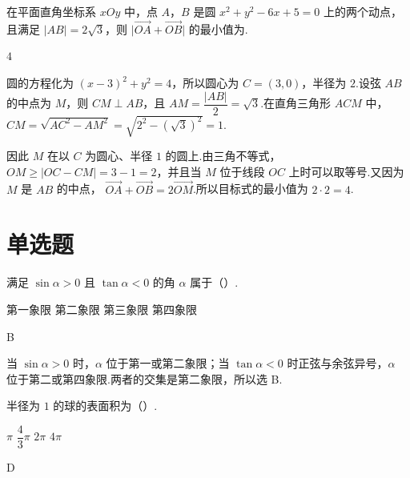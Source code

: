 \begin{problem}
在平面直角坐标系 \(xOy\) 中，点 \(A\)，\(B\) 是圆 \(x^2+y^2-6x+5=0\) 上的两个动点，且满足 \(\lvert AB\rvert=2\sqrt3\)，则 \(\lvert\overrightarrow{OA}+\overrightarrow{OB}\rvert\) 的最小值为\fillinblank{}.
\end{problem}

\begin{answer}
\(4\)
\end{answer}

\begin{solution}
圆的方程化为 \((x-3)^2+y^2=4\)，所以圆心为 \(C=(3,0)\)，半径为 \(2\).设弦 \(AB\) 的中点为 \(M\)，则 \(CM\perp AB\)，且
\(AM=\dfrac{|AB|}{2}=\sqrt3\).在直角三角形 \(ACM\) 中，
\(CM=\sqrt{AC^2-AM^2}=\sqrt{2^2-(\sqrt3)^2}=1\).

因此 \(M\) 在以 \(C\) 为圆心、半径 \(1\) 的圆上.由三角不等式，
\(OM\geq|OC-CM|=3-1=2\)，并且当 \(M\) 位于线段 \(OC\) 上时可以取等号.又因为 \(M\) 是 \(AB\) 的中点，
\(\overrightarrow{OA}+\overrightarrow{OB}=2\overrightarrow{OM}\).所以目标式的最小值为 \(2\cdot2=4\).
\end{solution}

\section{单选题}

\begin{problem}
满足 \(\sin\alpha>0\) 且 \(\tan\alpha<0\) 的角 \(\alpha\) 属于（\quad）.

\choices
    {第一象限}
    {第二象限}
    {第三象限}
    {第四象限}
\end{problem}

\begin{answer}
B
\end{answer}

\begin{solution}
当 \(\sin\alpha>0\) 时，\(\alpha\) 位于第一或第二象限；当 \(\tan\alpha<0\) 时正弦与余弦异号，\(\alpha\) 位于第二或第四象限.两者的交集是第二象限，所以选 B.
\end{solution}

\begin{problem}
半径为 \(1\) 的球的表面积为（\quad）.

\choices
    {\(\pi\)}
    {\(\dfrac43\pi\)}
    {\(2\pi\)}
    {\(4\pi\)}
\end{problem}

\begin{answer}
D
\end{answer}

